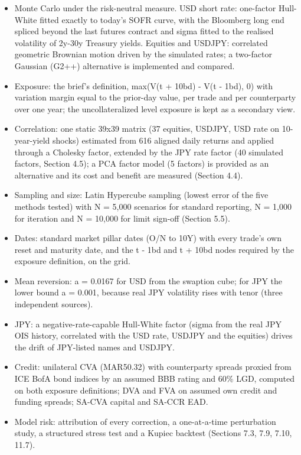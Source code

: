 \documentclass[11pt,letterpaper]{article}
\begin{document}
\begin{itemize}
\item Monte Carlo under the risk-neutral measure. USD short rate: one-factor Hull-White fitted exactly to today's SOFR curve, with the Bloomberg long end spliced beyond the last futures contract and sigma fitted to the realised volatility of 2y-30y Treasury yields. Equities and USDJPY: correlated geometric Brownian motion driven by the simulated rates; a two-factor Gaussian (G2++) alternative is implemented and compared.
\item Exposure: the brief's definition, max(V(t + 10bd) - V(t - 1bd), 0) with variation margin equal to the prior-day value, per trade and per counterparty over one year; the uncollateralized level exposure is kept as a secondary view.
\item Correlation: one static 39x39 matrix (37 equities, USDJPY, USD rate on 10-year-yield shocks) estimated from 616 aligned daily returns and applied through a Cholesky factor, extended by the JPY rate factor (40 simulated factors, Section 4.5); a PCA factor model (5 factors) is provided as an alternative and its cost and benefit are measured (Section 4.4).
\item Sampling and size: Latin Hypercube sampling (lowest error of the five methods tested) with N = 5,000 scenarios for standard reporting, N = 1,000 for iteration and N = 10,000 for limit sign-off (Section 5.5).
\item Dates: standard market pillar dates (O/N to 10Y) with every trade's own reset and maturity date, and the t - 1bd and t + 10bd nodes required by the exposure definition, on the grid.
\item Mean reversion: a = 0.0167 for USD from the swaption cube; for JPY the lower bound a = 0.001, because real JPY volatility rises with tenor (three independent sources).
\item JPY: a negative-rate-capable Hull-White factor (sigma from the real JPY OIS history, correlated with the USD rate, USDJPY and the equities) drives the drift of JPY-listed names and USDJPY.
\item Credit: unilateral CVA (MAR50.32) with counterparty spreads proxied from ICE BofA bond indices by an assumed BBB rating and 60\% LGD, computed on both exposure definitions; DVA and FVA on assumed own credit and funding spreads; SA-CVA capital and SA-CCR EAD.
\item Model risk: attribution of every correction, a one-at-a-time perturbation study, a structured stress test and a Kupiec backtest (Sections 7.3, 7.9, 7.10, 11.7).
\end{itemize}
\clearpage
\end{document}

